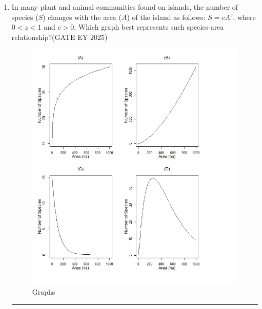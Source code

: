 \begin{enumerate}[leftmargin=*,label=\textbf{Q.\arabic*},resume]
\begin{multicols}{2}
\begin{enumerate}
\item i and ii
\item i and iv
\item ii and iii
\item iii and iv
\end{enumerate}
\end{multicols}

\item In many plant and animal communities found on islands, the number of species ($S$) changes with the area ($A$) of the island as follows: $S = c A^z$, where $0 < z < 1$ and $c>0$. Which graph best represents such species-area relationship?\hfill {(GATE EY 2025)}


\begin{figure}[H]
    \centering
    \includegraphics[width=0.9\columnwidth]{figs/imageQ36.png}
    \caption{Graphs}
    \label{fig:q36-graphs}
\end{figure}


\rule{7cm}{0.15mm}


\end{enumerate}
